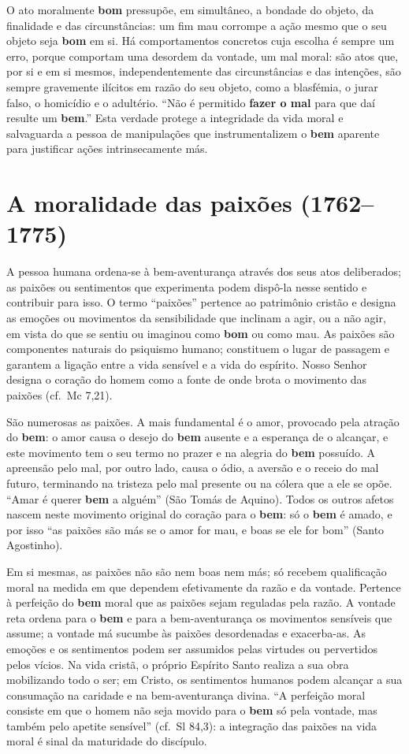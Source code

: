 O ato moralmente \textbf{bom} pressupõe, em simultâneo, a bondade do objeto, da finalidade e das circunstâncias: um fim mau corrompe a ação mesmo que o seu objeto seja \textbf{bom} em si. Há comportamentos concretos cuja escolha é sempre um erro, porque comportam uma desordem da vontade, um mal moral: são atos que, por si e em si mesmos, independentemente das circunstâncias e das intenções, são sempre gravemente ilícitos em razão do seu objeto, como a blasfémia, o jurar falso, o homicídio e o adultério. ``Não é permitido \textbf{fazer o mal} para que daí resulte um \textbf{bem}.'' Esta verdade protege a integridade da vida moral e salvaguarda a pessoa de manipulações que instrumentalizem o \textbf{bem} aparente para justificar ações intrinsecamente más.

\section{A moralidade das paixões (1762--1775)}

A pessoa humana ordena-se à bem-aventurança através dos seus atos deliberados; as paixões ou sentimentos que experimenta podem dispô-la nesse sentido e contribuir para isso. O termo ``paixões'' pertence ao patrimônio cristão e designa as emoções ou movimentos da sensibilidade que inclinam a agir, ou a não agir, em vista do que se sentiu ou imaginou como \textbf{bom} ou como mau. As paixões são componentes naturais do psiquismo humano; constituem o lugar de passagem e garantem a ligação entre a vida sensível e a vida do espírito. Nosso Senhor designa o coração do homem como a fonte de onde brota o movimento das paixões (cf.~Mc 7,21).

São numerosas as paixões. A mais fundamental é o amor, provocado pela atração do \textbf{bem}: o amor causa o desejo do \textbf{bem} ausente e a esperança de o alcançar, e este movimento tem o seu termo no prazer e na alegria do \textbf{bem} possuído. A apreensão pelo mal, por outro lado, causa o ódio, a aversão e o receio do mal futuro, terminando na tristeza pelo mal presente ou na cólera que a ele se opõe. ``Amar é querer \textbf{bem} a alguém'' (São Tomás de Aquino). Todos os outros afetos nascem neste movimento original do coração para o \textbf{bem}: só o \textbf{bem} é amado, e por isso ``as paixões são más se o amor for mau, e boas se ele for bom'' (Santo Agostinho).

Em si mesmas, as paixões não são nem boas nem más; só recebem qualificação moral na medida em que dependem efetivamente da razão e da vontade. Pertence à perfeição do \textbf{bem} moral que as paixões sejam reguladas pela razão. A vontade reta ordena para o \textbf{bem} e para a bem-aventurança os movimentos sensíveis que assume; a vontade má sucumbe às paixões desordenadas e exacerba-as. As emoções e os sentimentos podem ser assumidos pelas virtudes ou pervertidos pelos vícios. Na vida cristã, o próprio Espírito Santo realiza a sua obra mobilizando todo o ser; em Cristo, os sentimentos humanos podem alcançar a sua consumação na caridade e na bem-aventurança divina. ``A perfeição moral consiste em que o homem não seja movido para o \textbf{bem} só pela vontade, mas também pelo apetite sensível'' (cf.~Sl 84,3): a integração das paixões na vida moral é sinal da maturidade do discípulo.

